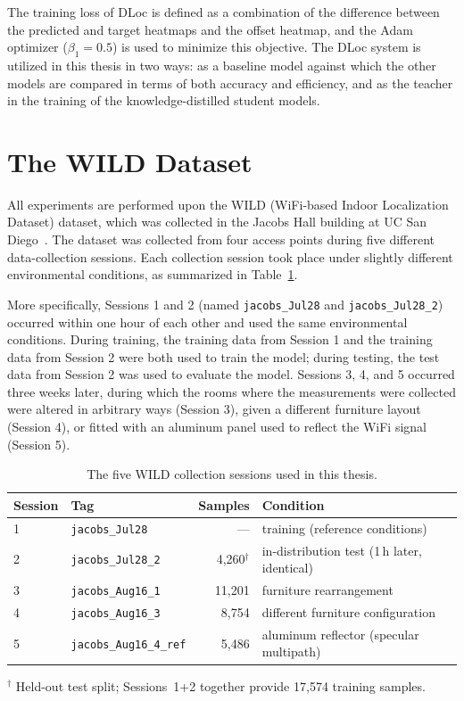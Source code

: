 The training loss of DLoc is defined as a combination of the difference between the predicted and target
heatmaps and the offset heatmap, and the Adam optimizer ($\beta_1 = 0.5$) is used to minimize this objective. The
DLoc system is utilized in this thesis in two ways: as a baseline model against which the other models
are compared in terms of both accuracy and efficiency, and as the teacher in the training of the
knowledge-distilled student models.

\section{The WILD Dataset}
\label{sec:method:dataset}

All experiments are performed upon the WILD (WiFi-based Indoor Localization Dataset) dataset, which was
collected in the Jacobs Hall building at UC San Diego~\cite{ayyalasomayajula2020deep}. The dataset was
collected from four access points during five different data-collection sessions. Each collection
session took place under slightly different environmental conditions, as summarized in
Table~\ref{tab:method:sessions}.

More specifically, Sessions 1 and 2 (named \texttt{jacobs\_Jul28} and \texttt{jacobs\_Jul28\_2})
occurred within one hour of each other and used the same environmental conditions. During training, the
training data from Session 1 and the training data from Session 2 were both used to train the model;
during testing, the test data from Session 2 was used to evaluate the model. Sessions 3, 4, and 5
occurred three weeks later, during which the rooms where the measurements were collected were altered in
arbitrary ways (Session 3), given a different furniture layout (Session 4), or fitted with an aluminum
panel used to reflect the WiFi signal (Session 5).

\begin{table}[H]
\centering
\caption{The five WILD collection sessions used in this thesis.}
\label{tab:method:sessions}
\begin{tabular}{@{}llrl@{}}
\toprule
\textbf{Session} & \textbf{Tag} & \textbf{Samples} & \textbf{Condition} \\
\midrule
1 & \texttt{jacobs\_Jul28}        & ---     & training (reference conditions) \\
2 & \texttt{jacobs\_Jul28\_2}     & 4{,}260$^\dagger$ & in-distribution test (1\,h later, identical) \\
3 & \texttt{jacobs\_Aug16\_1}     & 11{,}201 & furniture rearrangement \\
4 & \texttt{jacobs\_Aug16\_3}     & 8{,}754  & different furniture configuration \\
5 & \texttt{jacobs\_Aug16\_4\_ref}& 5{,}486  & aluminum reflector (specular multipath) \\
\bottomrule
\end{tabular}

\vspace{0.4em}
{\footnotesize $^\dagger$ Held-out test split; Sessions~1+2 together provide 17{,}574 training
samples.}
\end{table}

